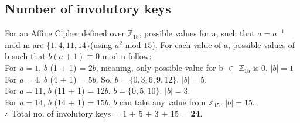 \documentclass[12pt]{article}
\begin{document}
\begin{large}
\subsection{Number of involutory keys}
For an Affine Cipher defined over $\mathbb{Z}_{15}$, possible values for a, such that $a = a^{-1}$ mod m are \{$1,4,11,14$\}(using $a^{2}$ mod $15$). For each value of a, possible values of b such that $b(a + 1) \equiv 0$ mod n follow:\\
For $a =  1$, $b$ (1 + 1) = $2b$, meaning, only possible value for b $\in$ $\mathbb{Z}_{15}$ is 0. $|b| = 1$\\
For $a = 4$, $b$ (4 + 1) = $5b$. So, $b = \{0,3,6,9,12\}$. $|b| = 5$.\\
For $a = 11$, $b$ (11 + 1) = $12b$. $b = \{0,5,10\}$. $|b| = 3$.\\
For $a = 14$, $b$ (14 + 1) = $15b$. $b$ can take any value from $\mathbb{Z}_{15}$. $|b| = 15$.\\
$\therefore$ Total no. of involutory keys = 1 + 5 + 3 + 15 = \textbf{24}.
\end{large}
\end{document}
